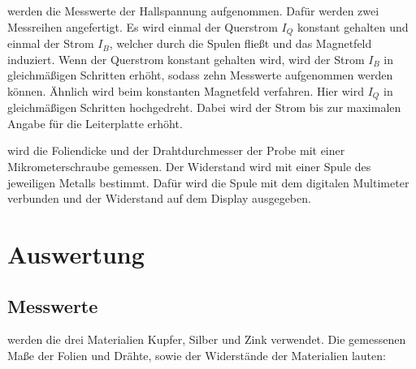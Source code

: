 \justifying werden die Messwerte der Hallspannung aufgenommen. Dafür werden zwei Messreihen angefertigt. Es wird einmal 
der Querstrom $I_Q$ konstant gehalten und einmal der Strom $I_B$, welcher durch die Spulen fließt und das Magnetfeld
induziert. Wenn der Querstrom konstant gehalten wird, wird der Strom $I_B$ in 
gleichmäßigen Schritten erhöht, sodass zehn Messwerte aufgenommen werden können. Ähnlich wird beim konstanten
Magnetfeld verfahren. Hier wird $I_Q$ in gleichmäßigen Schritten hochgedreht. Dabei wird der Strom
bis zur maximalen Angabe für die Leiterplatte erhöht.

\justifying wird die Foliendicke und der Drahtdurchmesser der Probe mit einer Mikrometerschraube gemessen. Der Widerstand wird 
mit einer Spule des jeweiligen Metalls bestimmt. Dafür wird die Spule mit dem digitalen Multimeter verbunden und
der Widerstand auf dem Display ausgegeben.



\section{Auswertung} \label{sec:5}

\subsection{Messwerte} \label{sec:5.1}

\justifying werden die drei Materialien Kupfer, Silber und Zink verwendet. 
 Die gemessenen Maße der Folien und Drähte, sowie der Widerstände der Materialien lauten:

